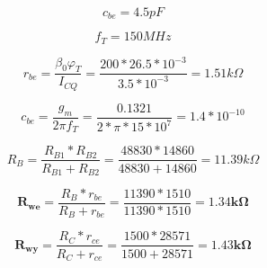 \documentclass[a4paper,12pt]{article}
\begin{document}
\begin{figure}

\begin{equation}
 c_{be} = 4.5pF
\end{equation}

\begin{equation}
 f_T = 150MHz
\end{equation}

\begin{equation}
r_{be} = \frac{\beta_0 \varphi_T}{I_{CQ}} = \frac{200 * 26.5*10^{-3}}{3.5*10^{-3}} = 1.51k\Omega
\end{equation}

\begin{equation}
 c_{be} = \frac{g_m}{2\pi f_T} = \frac{0.1321}{2*\pi*15*10^7} = 1.4*10^{-10}
\end{equation}

\begin{equation}
 R_B = \frac{R_{B1}*R_{B2}}{R_{B1}+R_{B2}} = \frac{48830*14860}{48830+14860} = 11.39k\Omega
\end{equation}

\begin{equation}
 \mathbf{R_{we}} = \frac{R_{B}*r_{be}}{R_{B}+r_{be}} = \frac{11390*1510}{11390*1510} = \mathbf{1.34k\Omega}
\end{equation}
 
 \begin{equation}
 \mathbf{R_{wy}} =  \frac{R_{C}*r_{ce}}{R_{C}+r_{ce}} = \frac{1500*28571}{1500+28571} = \mathbf{1.43k\Omega}
\end{equation}
 
\end{figure}
\end{document}

